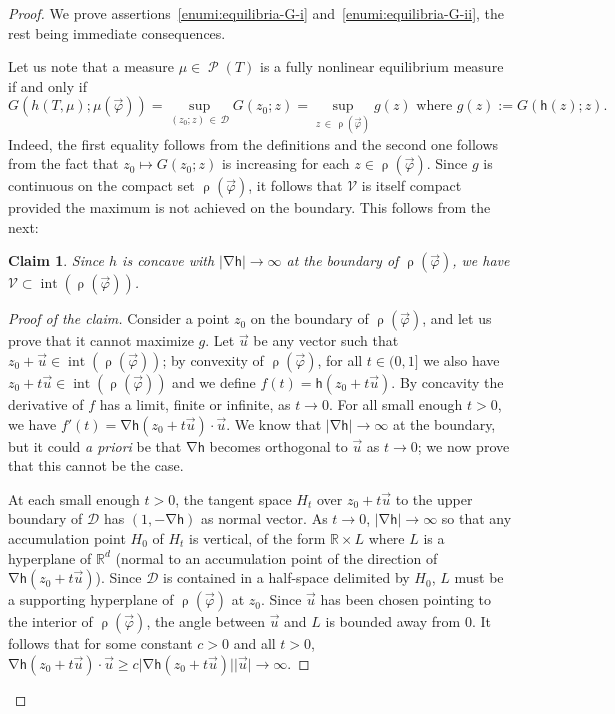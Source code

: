 \documentclass[10pt]{amsart}
\theoremstyle{definition}\newtheorem{defi}[theo]{Definition}\newtheorem{rema}[theo]{Remark}\newtheorem{exam}[theo]{Example}\newtheorem{exem}[theo]{Example}\newtheorem{nota}[theo]{Notation}
\theoremstyle{plain}
\theoremstyle{plain}
\newtheorem{claim}{Claim}
\newcommand\vpot{\vec\pot}
\newcommand\inter{\operatorname{int}}
\newcommand\Prob{{\operatorname{\mathscr{P}}}}
\newcommand{\rs}{\operatorname{\rho}}
\newcommand{\grad}{\operatorname{\nabla}}
\newcommand{\hf}{\mathsf{h}}
\newcommand{\pot}{\varphi}
\newcounter{In}
\newcommand*\8{\infty}
\newcommand\RR{\mathbb{R}}
\newcommand{\CD}{\mathcal{D}}
\newcommand{\cD}{\mathcal{D}}
\newcommand{\scV}{\mathscr{V}}
\begin{document}
\begin{proof}
We prove assertions~\eqref{enumi:equilibria-G-i} and~\eqref{enumi:equilibria-G-ii}, the rest being immediate consequences.

Let us note that a measure $\mu\in\Prob(T)$ is a fully nonlinear equilibrium measure if and only if
\[
G(h(T,\mu);\mu(\vpot)) = \sup_{(z_0; z)\,\in\,\CD} G(z_0; z) = \sup_{z\,\in\,\rs(\vpot)} g(z) \text{ where }g(z):=G(\hf(z); z).
\]
Indeed, the first equality follows from the definitions and the second one follows from the fact that $z_0\mapsto G(z_0; z)$ is increasing for each $ z\in\rs(\vpot)$. Since $g$ is continuous on the compact set $\rs(\vpot)$, it follows that $\scV$ is itself compact provided the maximum is not achieved on the boundary. This follows from the next:

\begin{claim}\label{claim-boundary}
Since $h$ is concave with $\lvert \grad\hf \rvert\to\infty$ at the boundary of $\rs(\vpot)$, we have $\scV\subset\inter(\rs(\vpot))$.
\end{claim}

\begin{proof}[Proof of the claim]
Consider a point $z_0$ on the boundary of $\rs(\vpot)$, and let us prove that it cannot maximize $g$. Let $\vec u$ be any vector such that $z_0+\vec u\in\inter(\rs(\vpot))$; by convexity of $\rs(\vpot)$, for all $t\in(0,1]$ we also have $z_0+t\vec u\in\inter(\rs(\vpot))$ and we define $f(t) = \hf(z_0+t\vec u)$. By concavity the derivative of $f$ has a limit, finite or infinite, as $t\to0$. For all {small enough} $t>0$, we have $f'(t) = \grad\hf(z_0+t\vec u) \cdot \vec u$. We know that $\lvert\grad \hf\rvert\to\infty$ at the boundary, but it could {\it a priori} be that $\grad \hf$ becomes orthogonal to $\vec u$ as $t\to0$; we now prove that this cannot be the case.

At each small enough $t>0$, the tangent space $H_t$ over $z_0+t\vec u$ to the upper boundary of $\cD$ has $(1,-\grad\hf)$ as normal vector. As $t\to0$, $\lvert \grad\hf\rvert\to\infty$ so that any accumulation point $H_0$ of $H_t$ is vertical, of the form $\RR\times L$ where $L$ is a hyperplane of $\RR^d$ (normal to an accumulation point of the direction of $\grad\hf(z_0+t\vec u)$). Since $\cD$ is contained in a half-space delimited by $H_0$, $L$ must be a supporting hyperplane of $\rs(\vpot)$ at $z_0$. Since $\vec u$ has been chosen pointing to the interior of $\rs(\vpot)$, the angle between $\vec u$ and $L$ is bounded away from $0$. It follows that for some constant $c>0$ and all $t>0$, $\grad\hf(z_0+t\vec u)\cdot\vec u \ge c\lvert \grad\hf(z_0+t\vec u)\rvert \lvert \vec u\rvert\to\infty$.


\end{proof}
\end{proof}
\end{document}
